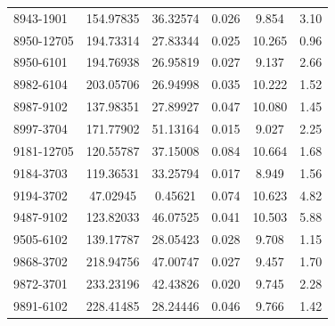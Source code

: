 \begin{table}
\begin{tabular}{lccccc}
8943-1901 & 154.97835 & 36.32574 & 0.026 & 9.854 & 3.10 \\
8950-12705 & 194.73314 & 27.83344 & 0.025 & 10.265 & 0.96 \\
8950-6101 & 194.76938 & 26.95819 & 0.027 & 9.137 & 2.66 \\
8982-6104 & 203.05706 & 26.94998 & 0.035 & 10.222 & 1.52 \\
8987-9102 & 137.98351 & 27.89927 & 0.047 & 10.080 & 1.45 \\
8997-3704 & 171.77902 & 51.13164 & 0.015 & 9.027 & 2.25 \\
9181-12705 & 120.55787 & 37.15008 & 0.084 & 10.664 & 1.68 \\
9184-3703 & 119.36531 & 33.25794 & 0.017 & 8.949 & 1.56 \\
9194-3702 & 47.02945 & 0.45621 & 0.074 & 10.623 & 4.82 \\
9487-9102 & 123.82033 & 46.07525 & 0.041 & 10.503 & 5.88 \\
9505-6102 & 139.17787 & 28.05423 & 0.028 & 9.708 & 1.15 \\
9868-3702 & 218.94756 & 47.00747 & 0.027 & 9.457 & 1.70 \\
9872-3701 & 233.23196 & 42.43826 & 0.020 & 9.745 & 2.28 \\
9891-6102 & 228.41485 & 28.24446 & 0.046 & 9.766 & 1.42 \\
\hline
\end{tabular}
\end{table}

